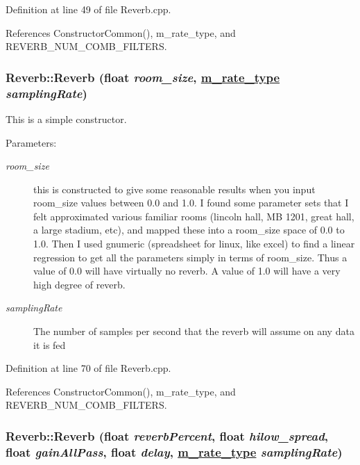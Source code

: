 Definition at line 49 of file Reverb.cpp.

References Constructor\-Common(), m\_\-rate\_\-type, and REVERB\_\-NUM\_\-COMB\_\-FILTERS.\hypertarget{classReverb_a1}{
\subsubsection[Reverb]{\setlength{\rightskip}{0pt plus 5cm}Reverb::Reverb (float {\em room\_\-size}, \hyperlink{Types_8h_a4}{m\_\-rate\_\-type} {\em sampling\-Rate})}}
\label{classReverb_a1}


This is a simple constructor. \begin{Desc}
\item[Parameters:]
\begin{description}
\item[{\em room\_\-size}]this is constructed to give some reasonable results when you input room\_\-size values between 0.0 and 1.0. I found some parameter sets that I felt approximated various familiar rooms (lincoln hall, MB 1201, great hall, a large stadium, etc), and mapped these into a room\_\-size space of 0.0 to 1.0. Then I used gnumeric (spreadsheet for linux, like excel) to find a linear regression to get all the parameters simply in terms of room\_\-size. Thus a value of 0.0 will have virtually no reverb. A value of 1.0 will have a very high degree of reverb. \item[{\em sampling\-Rate}]The number of samples per second that the reverb will assume on any data it is fed \end{description}
\end{Desc}


Definition at line 70 of file Reverb.cpp.

References Constructor\-Common(), m\_\-rate\_\-type, and REVERB\_\-NUM\_\-COMB\_\-FILTERS.\hypertarget{classReverb_a2}{
\subsubsection[Reverb]{\setlength{\rightskip}{0pt plus 5cm}Reverb::Reverb (float {\em reverb\-Percent}, float {\em hilow\_\-spread}, float {\em gain\-All\-Pass}, float {\em delay}, \hyperlink{Types_8h_a4}{m\_\-rate\_\-type} {\em sampling\-Rate})}}
\label{classReverb_a2}


